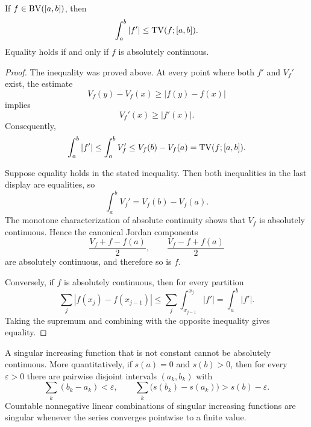 \begin{prop}
If $f\in\operatorname{BV}([a,b])$, then
\[
\int_a^b|f'|\leq\operatorname{TV}(f;[a,b]).
\]
Equality holds if and only if $f$ is absolutely continuous.
\end{prop}

\begin{proof}
The inequality was proved above. At every point where both $f'$ and $V_f'$ exist, the estimate
\[
V_f(y)-V_f(x)\geq|f(y)-f(x)|
\]
implies
\[
V_f'(x)\geq|f'(x)|.
\]
Consequently,
\[
\int_a^b|f'|\leq\int_a^bV_f'
\leq V_f(b)-V_f(a)=\operatorname{TV}(f;[a,b]).
\]

Suppose equality holds in the stated inequality. Then both inequalities in the last display are equalities, so
\[
\int_a^bV_f'=V_f(b)-V_f(a).
\]
The monotone characterization of absolute continuity shows that $V_f$ is absolutely continuous. Hence the canonical Jordan components
\[
\frac{V_f+f-f(a)}2,
\qquad
\frac{V_f-f+f(a)}2
\]
are absolutely continuous, and therefore so is $f$.

Conversely, if $f$ is absolutely continuous, then for every partition
\[
\sum_j|f(x_j)-f(x_{j-1})|
\leq\sum_j\int_{x_{j-1}}^{x_j}|f'|
=\int_a^b|f'|.
\]
Taking the supremum and combining with the opposite inequality gives equality.
\end{proof}

\begin{exercise}
A singular increasing function that is not constant cannot be absolutely continuous. More quantitatively, if $s(a)=0$ and $s(b)>0$, then for every $\varepsilon>0$ there are pairwise disjoint intervals $(a_k,b_k)$ with
\[
\sum_k(b_k-a_k)<\varepsilon,
\qquad
\sum_k\bigl(s(b_k)-s(a_k)\bigr)>s(b)-\varepsilon.
\]
Countable nonnegative linear combinations of singular increasing functions are singular whenever the series converges pointwise to a finite value.
\end{exercise}

